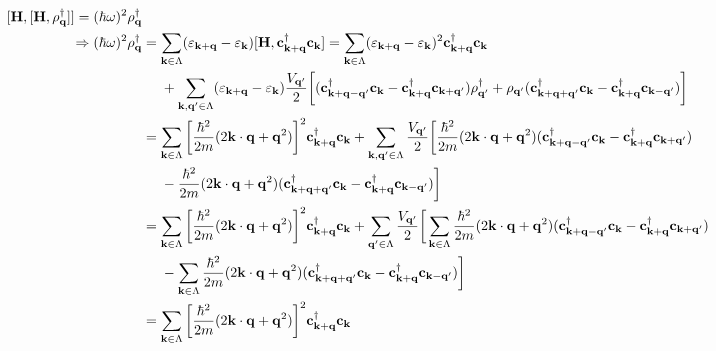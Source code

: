 \documentclass{homework}
\begin{document}
\begin{equation}
\begin{split}
    [{\bf H}, [{\bf H}, \rho_{\bf q}^\dagger]] = (\hbar \omega)^2 \rho_{{\bf q}}^\dagger \\
    \Rightarrow (\hbar \omega)^2 \rho_{{\bf q}}^\dagger &= \sum_{{\bf k} \in \Lambda} (\varepsilon_{{\bf k + q}} - \varepsilon_{{\bf k}}) [{\bf H}, {\bf c}_{{\bf {\bf k} + q}}^\dagger {\bf c}_{{\bf k}}] = \sum_{{\bf k} \in \Lambda} (\varepsilon_{{\bf k + q}} - \varepsilon_{{\bf k}})^2 {\bf c}_{{\bf k + q}}^\dagger {\bf c}_{{\bf k}} \\
    & \blanky \blanky \blanky \blanky+ \sum_{{\bf k}, {\bf q}' \in \Lambda} (\varepsilon_{{\bf k + q}} - \varepsilon_{{\bf k}}) \frac{V_{{\bf q}'}}{2} \bigg[({\bf c}_{{\bf {\bf k} + q - q'}}^\dagger {\bf c}_{{\bf k}} - {\bf c}_{{\bf k + q}}^\dagger {\bf c}_{{\bf {\bf k} + q'}}) \rho_{{\bf q}'}^\dagger + \rho_{{\bf q}'} ({\bf c}_{{\bf {\bf k} + q + q'}}^\dagger {\bf c}_{{\bf k}} - {\bf c}_{{\bf k + q}}^\dagger {\bf c}_{{\bf {\bf k} - q'}})\bigg] \\
    &= \sum_{{\bf k} \in \Lambda} \bigg[ \frac{\hbar^2}{2m} (2 {\bf k} \cdot {\bf q} + {\bf q}^2)\bigg]^2 {\bf c}_{{\bf k}+{\bf q}}^\dagger {\bf c}_{{\bf k}} + \sum_{{\bf k}, {\bf q}' \in \Lambda} \frac{V_{\bf q'}}{2}\bigg[\frac{\hbar^2}{2m}(2 {\bf k}\cdot {\bf q} + {\bf q}^2) ({\bf c}_{{\bf {\bf k} + q - q'}}^\dagger {\bf c}_{{\bf k}} - {\bf c}_{{\bf k + q}}^\dagger {\bf c}_{{\bf {\bf k} + q'}}) \\ & \blanky \blanky \blanky \blanky - \frac{\hbar^2}{2m}(2 {\bf k}\cdot {\bf q} + {\bf q}^2) ({\bf c}_{{\bf {\bf k} + q + q'}}^\dagger {\bf c}_{{\bf k}} - {\bf c}_{{\bf k + q}}^\dagger {\bf c}_{{\bf {\bf k} - q'}})\bigg] \\
    &= \sum_{{\bf k} \in \Lambda} \bigg[ \frac{\hbar^2}{2m} (2 {\bf k} \cdot {\bf q} + {\bf q}^2)\bigg]^2 {\bf c}_{{\bf k}+{\bf q}}^\dagger {\bf c}_{{\bf k}} + \sum_{{\bf q}' \in \Lambda} \frac{V_{\bf q'}}{2} \bigg[ \sum_{{\bf k} \in \Lambda}\frac{\hbar^2}{2m}(2 {\bf k}\cdot {\bf q} + {\bf q}^2) ({\bf c}_{{\bf {\bf k} + q - q'}}^\dagger {\bf c}_{{\bf k}} - {\bf c}_{{\bf k + q}}^\dagger {\bf c}_{{\bf {\bf k} + q'}}) \\ 
    & \blanky \blanky \blanky \blanky - \sum_{{\bf k} \in \Lambda}\frac{\hbar^2}{2m}(2 {\bf k}\cdot {\bf q} + {\bf q}^2) ({\bf c}_{{\bf {\bf k} + q + q'}}^\dagger {\bf c}_{{\bf k}} - {\bf c}_{{\bf k + q}}^\dagger {\bf c}_{{\bf {\bf k} -
    q'}})\bigg] \\
    &= \sum_{{\bf k} \in \Lambda} \bigg[ \frac{\hbar^2}{2m} (2 {\bf k} \cdot {\bf q} + {\bf q}^2)\bigg]^2 {\bf c}_{{\bf k}+{\bf q}}^\dagger {\bf c}_{{\bf k}} \\

\end{split}
\end{equation}
\end{document}
